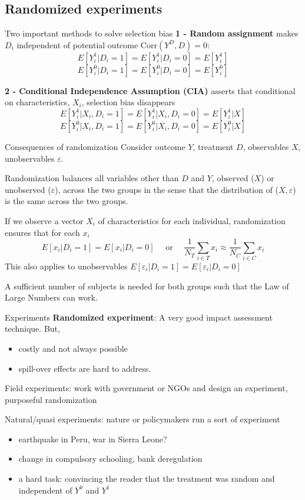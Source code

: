 \documentclass{beamer}
\begin{document}
\subsection{Randomized experiments}

\begin{frame}{Two important methods to solve selection bias}
\textbf{1 - Random assignment} makes $D_i$ independent of potential outcome Corr$(Y^D,D)=0$:
\[E[Y_{i}^1|D_i=1]=E[Y_{i}^1|D_i=0]=E[Y_{i}^1]\] \[ E[Y_{i}^0|D_i=1]=E[Y_{i}^0|D_i=0]=E[Y_{i}^0]\]


\bigskip
\textbf{2 - Conditional Independence Assumption (CIA)} asserts that conditional on characteristics, $X_i$, selection bias disappears
\[E[Y_{i}^1|X_i,D_i=1]=E[Y_{i}^1|X_i,D_i=0]=E[Y_{i}^1|X] \]
\[E[Y_{i}^0|X_i,D_i=1]=E[Y_{i}^0|X_i,D_i=0]=E[Y_{i}^0|X] \]
\end{frame}


\begin{frame}{Consequences of randomization}
Consider outcome $Y$, treatment $D$, observables $X$, unobservables $\varepsilon$.\bigskip\pause

Randomization balances all variables other than $D$ and $Y$, observed ($X$) or unobserved ($\varepsilon$), across the two groups in the sense that the distribution of ($X,\varepsilon$) is the same across the two groups.\bigskip\pause

If we observe a vector $X_i$ of characteristics for each individual, randomization ensures that for each $x_i$
\[E[x_i|D_i=1]=E[x_i|D_i=0] \quad \text{ or }  \quad \frac{1}{N_T}\sum_{i\in T} x_i \approx \frac{1}{N_C}\sum_{i\in C} x_i \]
This also applies to unobservables $E[\varepsilon_i|D_i=1]=E[\varepsilon_i|D_i=0]$\bigskip

A sufficient number of subjects is needed for both groups such that the Law of Large Numbers can work.


\end{frame}




\begin{frame}{Experiments}
\textbf{Randomized experiment}: A very good impact assessment technique. But, 
\begin{itemize}
\item costly and not always possible
\item spill-over effects are hard to address.
\end{itemize}\bigskip\pause

Field experiments: work with government or NGOs and design an experiment, purposeful randomization\medskip\pause


Natural/quasi experiments: nature or policymakers run a sort of experiment
\begin{itemize}
\item earthquake in Peru, war in Sierra Leone?
\item change in compulsory schooling, bank deregulation
\item a hard task:  convincing the reader that the treatment was random and independent of $Y^0$ and $Y^1$
\end{itemize}
\end{frame}
\end{document}
